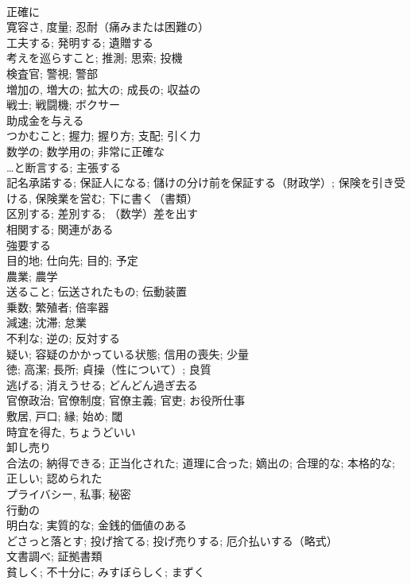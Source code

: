 \documentclass[8pt]{extreport}
\begin{document}
\begin{CJK}{UTF8}{min}
\\	正確に	
\\	寛容さ, 度量; 忍耐（痛みまたは困難の）	
\\	工夫する; 発明する; 遺贈する	
\\	考えを巡らすこと; 推測; 思索; 投機	
\\	検査官; 警視; 警部	
\\	増加の, 増大の; 拡大の; 成長の; 収益の	
\\	戦士; 戦闘機; ボクサー	
\\	助成金を与える	
\\	つかむこと; 握力; 握り方; 支配; 引く力	
\\	数学の; 数学用の; 非常に正確な	
\\	…と断言する; 主張する	
\\	記名承諾する; 保証人になる; 儲けの分け前を保証する（財政学）; 保険を引き受ける, 保険業を営む; 下に書く（書類）	
\\	区別する; 差別する; （数学）差を出す	
\\	相関する; 関連がある	
\\	強要する	
\\	目的地; 仕向先; 目的; 予定	
\\	農業; 農学	
\\	送ること; 伝送されたもの; 伝動装置	
\\	乗数; 繁殖者; 倍率器	
\\	減速; 沈滞; 怠業	
\\	不利な; 逆の; 反対する	
\\	疑い; 容疑のかかっている状態; 信用の喪失; 少量	
\\	徳; 高潔; 長所; 貞操（性について）; 良質	
\\	逃げる; 消えうせる; どんどん過ぎ去る	
\\	官僚政治; 官僚制度; 官僚主義; 官吏; お役所仕事	
\\	敷居, 戸口; 縁; 始め; 閾	
\\	時宜を得た, ちょうどいい	
\\	卸し売り	
\\	合法の; 納得できる; 正当化された; 道理に合った; 嫡出の; 合理的な; 本格的な; 正しい; 認められた	
\\	プライバシー, 私事; 秘密	
\\	行動の	
\\	明白な; 実質的な; 金銭的価値のある	
\\	どさっと落とす; 投げ捨てる; 投げ売りする; 厄介払いする（略式）	
\\	文書調べ; 証拠書類	
\\	貧しく; 不十分に; みすぼらしく; まずく	

\end{CJK}
\end{document}
